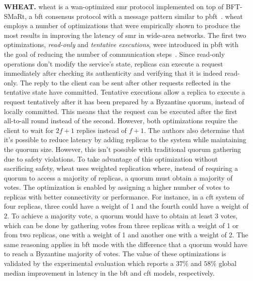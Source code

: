 \textbf{WHEAT.} \acrfull{wheat} is a \acrshort{wan}-optimized \acrshort{smr} protocol implemented on top of BFT-SMaRt, a \acrshort{bft} consensus protocol with a message pattern similar to \acrshort{pbft}~\cite{Sousa2016,Bessani:2014}. \acrshort{wheat} employs a number of optimizations that were empirically shown to produce the most results in improving the latency of \acrshort{smr} in wide-area networks. The first two optimizations, \textit{read-only} and \textit{tentative executions}, were introduced in \acrshort{pbft} with the goal of reducing the number of communication steps~\cite{Castro1999}. Since read-only operations don't modify the service's state, replicas can execute a request immediately after checking its authenticity and verifying that it is indeed read-only. The reply to the client can be sent after other requests reflected in the tentative state have committed. Tentative executions allow a replica to execute a request tentatively after it has been prepared by a Byzantine quorum, instead of locally committed. This means that the request can be executed after the first all-to-all round instead of the second. However, both optimizations require the client to wait for $2f+1$ replies instead of $f+1$. The authors also determine that it's possible to reduce latency by adding replicas to the system while maintaining the quorum size. However, this isn't possible with traditional quorum gathering due to safety violations. To take advantage of this optimization without sacrificing safety, \acrshort{wheat} uses weighted replication where, instead of requiring a quorum to access a majority of replicas, a quorum must obtain a majority of votes. The optimization is enabled by assigning a higher number of votes to replicas with better connectivity or performance. For instance, in a \acrshort{cft} system of four replicas, three could have a weight of 1 and the fourth could have a weight of 2. To achieve a majority vote, a quorum would have to obtain at least 3 votes, which can be done by gathering votes from three replicas with a weight of 1 or from two replicas, one with a weight of 1 and another one with a weight of 2. The same reasoning applies in \acrshort{bft} mode with the difference that a quorum would have to reach a Byzantine majority of votes. The value of these optimizations is validated by the experimental evaluation which reports a $37\%$ and $58\%$ global median improvement in latency in the \acrshort{bft} and \acrshort{cft} models, respectively. \par
